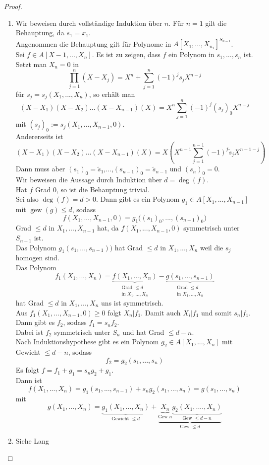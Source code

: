 \documentclass[10pt,a4paper]{article}
\newcommand{\weight}{\operatorname{gew}}
\theoremstyle{plain}
\theoremstyle{definition}
\theoremstyle{remark}
\begin{document}
	\begin{proof}
		\begin{enumerate}
			\item Wir beweisen durch vollständige Induktion über $n$.
			Für $n=1$ gilt die Behauptung, da $s_1=x_1$.\\
			Angenommen die Behauptung gilt für Polynome in $A[X_1,...,X_{n_1}]^{S_{n-1}}$.\\
			Sei $f\in A[X-1,...,X_n]$. Es ist zu zeigen, dass $f$ ein Polynom in $s_1,...,s_n$ ist.\\
			Setzt man $X_n=0$ in 
			\[\prod_{j=1}^{n}(X-X_j)=X^n+\sum_{j=1}^{n}(-1)^js_jX^{n-j}\]
			für $s_j=s_j(X_1,...,X_n)$, so erhält man
			\[(X-X_1)(X-X_2)...(X-X_{n-1})(X)=X^n\sum_{j=1}^{n}(-1)^j (s_j)_0X^{n-j}\]
			mit $(s_j)_0:=s_j(X_1,...,X_{n-1},0)$.\\
			Andererseits ist
			\[(X-X_1)(X-X_2)...(X-X_{n-1})(X)=X\left(X^{n-1}\sum_{j=1}^{n-1}(-1)^j \tilde s_j X^{n-1-j}\right)\]
			Dann muss aber $(s_1)_0=\tilde s_1$,...,$(s_{n-1})_0=\tilde{s}_{n-1}$ und $(s_n)_0=0$.\\
			Wir beweisen die Aussage durch Induktion über $d=\deg(f)$.\\
			Hat $f$ Grad $0$, so ist die Behauptung trivial.\\
			Sei also $\deg(f)=d>0$. Dann gibt es ein Polynom $g_1\in A[X_1,...,X_{n-1}]$ mit $\weight(g)\leq d$, sodass
			\[f(X_1,...,X_{n-1},0)=g_1\big((s_1)_0,...,(s_{n-1})_0\big)\]
			Grad $\leq d$ in $X_1,...,X_{n-1}$ hat, da $f(X_1,...,X_{n-1},0)$ symmetrisch unter $S_{n-1}$ ist.\\
			Das Polynom $g_1(s_1,...,s_{n-1})\big)$ hat Grad $\leq d$ in $X_1,...,X_n$ weil die $s_j$ homogen sind.\\
			Das Polynom
			\[f_1(X_1,...,X_n)=\underbrace{f(X_1,...,X_n)}_{\substack{\text{Grad $\leq d$}\\\text{in $X_1,...,X_n$}}}
			-\underbrace{g(s_1,...,s_{n-1})}_{\substack{\text{Grad $\leq d$}\\\text{in $X_1,...,X_n$}}}\]
			hat Grad $\leq d$ in $X_1,...,X_n$ uns ist symmetrisch. \\
			Aus $f_1(X_1,...,X_{n-1},0)\geq 0$ folgt $X_n|f_1$. Damit auch $X_i|f_1$ und somit $s_n|f_1$.\\
			Dann gibt es $f_2$, sodass $f_1=s_nf_2$.\\
			Dabei ist $f_2$ symmetrisch unter $S_n$ und hat Grad $\leq d-n$.\\
			Nach Induktionshypothese gibt es ein Polynom $g_2\in A[X_1,...,X_n]$ mit Gewicht $\leq d-n$, sodass
			\[f_2=g_2(s_1,...,s_n)\]
			Es folgt $f=f_1+g_1=s_ng_2+g_1$.\\
			Dann ist
			\[f(X_1,...,X_n)=g_1(s_1,...,s_{n-1})+s_ng_2(s_1,...,s_n)=g(s_1,...,s_n)\]
			mit
			\[g(X_1,...,X_n)=\underbrace{g_1(X_1,...,X_n)}_{\text{Gewicht $\leq d$}}+\underbrace{\underbrace{X_n}_{\text{Gew $n$}}\underbrace{g_2(X_1,....,X_n)}_{\text{Gew $\leq d-n$}}}_{\text{Gew $\leq d$}}\]
			\item Siehe Lang
		\end{enumerate}
	\end{proof}
\end{document}
